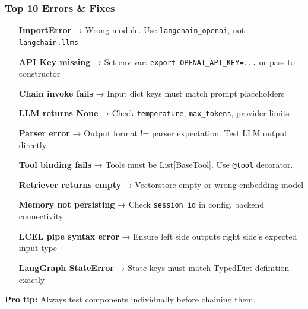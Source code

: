 \documentclass[aspectratio=169,11pt]{beamer}
\begin{document}
\begin{frame}
  \frametitle{Top 10 Errors \& Fixes}

  \begin{enumerate}
    \item[\textbf{ImportError}] → Wrong module. Use \texttt{langchain\_openai}, not \texttt{langchain.llms}
    \item[\textbf{API Key missing}] → Set env var: \texttt{export OPENAI\_API\_KEY=...} or pass to constructor
    \item[\textbf{Chain invoke fails}] → Input dict keys must match prompt placeholders
    \item[\textbf{LLM returns None}] → Check \texttt{temperature}, \texttt{max\_tokens}, provider limits
    \item[\textbf{Parser error}] → Output format != parser expectation. Test LLM output directly.
    \item[\textbf{Tool binding fails}] → Tools must be List[BaseTool]. Use \texttt{@tool} decorator.
    \item[\textbf{Retriever returns empty}] → Vectorstore empty or wrong embedding model
    \item[\textbf{Memory not persisting}] → Check \texttt{session\_id} in config, backend connectivity
    \item[\textbf{LCEL pipe syntax error}] → Ensure left side outputs right side's expected input type
    \item[\textbf{LangGraph StateError}] → State keys must match TypedDict definition exactly
  \end{enumerate}

  \vspace{0.5cm}
  \textbf{Pro tip:} Always test components individually before chaining them.
\end{frame}
\end{document}
